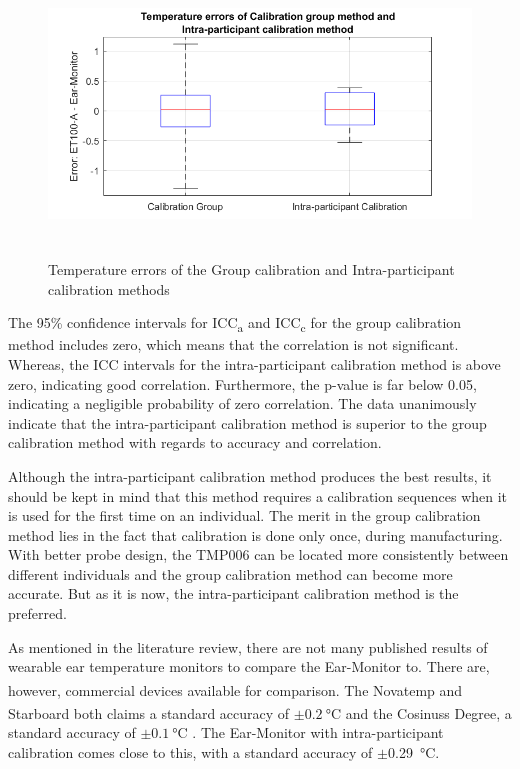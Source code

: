 \begin{figure}[H]
   \centering
   \includegraphics[width=12cm,height=7.5cm]{figs/ComparingCalibrationBoxplot.png}
   \caption{Temperature errors of the Group calibration and Intra-participant calibration methods}
   \label{fig:ComparingCalibrationBoxplot}
\end{figure}

The 95\% confidence intervals for ICC\textsubscript{a} and ICC\textsubscript{c} for the group calibration method includes zero, which means that the correlation is not significant. Whereas, the ICC intervals for the intra-participant calibration method is above zero, indicating good correlation. Furthermore, the p-value is far below 0.05, indicating a negligible probability of zero correlation. The data unanimously indicate that the intra-participant calibration method is superior to the group calibration method with regards to accuracy and correlation. 

\medskip

Although the intra-participant calibration method produces the best results, it should be kept in mind that this method requires a calibration sequences when it is used for the first time on an individual. The merit in the group calibration method lies in the fact that calibration is done only once, during manufacturing. With better probe design, the TMP006 can be located more consistently between different individuals and the group calibration method can become more accurate. But as it is now, the intra-participant calibration method is the preferred.

\medskip

As mentioned in the literature review, there are not many published results of wearable ear temperature monitors to compare the Ear-Monitor to. There are, however, commercial devices available for comparison. The Novatemp\textsuperscript{\textregistered{}} and Starboard\textsuperscript{\textregistered{}} both claims a standard accuracy of $\pm\SI{0.2}{\celsius}$ \citep{Novatemp, Starboard} and the Cosinuss Degree\textsuperscript{\textregistered{}}, a standard accuracy of $\pm\SI{0.1}{\celsius}$ \citep{CosinussDegree}. The Ear-Monitor with intra-participant calibration comes close to this, with a standard accuracy of $\pm$\SI{0.29}{\celsius}.

